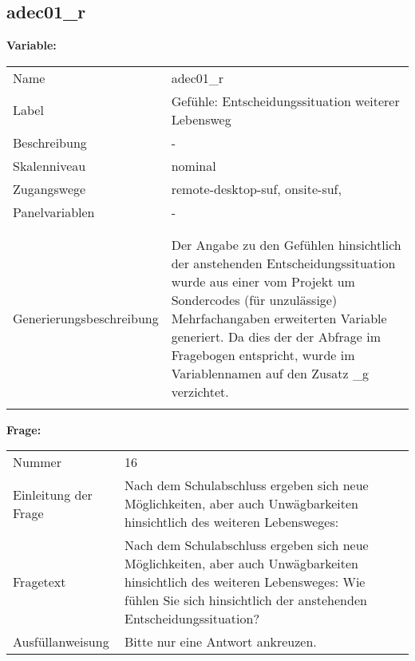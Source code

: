 	
	
	\subsection{adec01\_r}
	\label{subSection:adec01_r}

	\noindent\textbf{Variable:}\\
		\begin{tabular}{lL{11.3cm}}
			\label{tableVariable:adec01_r}
			Name & adec01\_r \\
			Label & Gefühle: Entscheidungssituation weiterer Lebensweg \\
			Beschreibung & - \\
			Skalenniveau & nominal \\
			Zugangswege &
				remote-desktop-suf,
				onsite-suf,
 \\
			Panelvariablen & -
			 \\
			 \\
 \\
					Generierungsbeschreibung & Der Angabe zu den Gefühlen hinsichtlich der anstehenden Entscheidungssituation wurde aus einer vom Projekt um Sondercodes (für unzulässige) Mehrfachangaben erweiterten Variable generiert. Da dies der der Abfrage im Fragebogen entspricht, wurde im Variablennamen auf den Zusatz \_g verzichtet.
				 \\	
			 \\
		\end{tabular}

		\vspace*{1 cm}
		\noindent\textbf{Frage:}\\
		\begin{tabular}{lL{11.3cm}}
			\label{tableQuestion:adec01_r}
			Nummer & 16 \\
			Einleitung der Frage & Nach dem Schulabschluss ergeben sich neue Möglichkeiten, aber auch Unwägbarkeiten hinsichtlich des weiteren Lebensweges: \\
			Fragetext & Nach dem Schulabschluss ergeben sich neue Möglichkeiten, aber auch Unwägbarkeiten hinsichtlich des weiteren Lebensweges: Wie fühlen Sie sich hinsichtlich der anstehenden Entscheidungssituation? \\
			Ausfüllanweisung & Bitte nur eine Antwort ankreuzen. \\
		\end{tabular}





